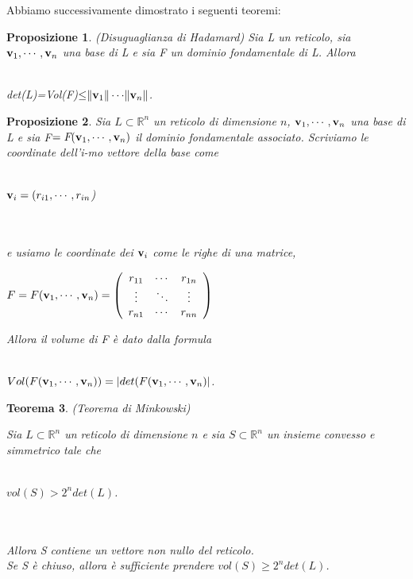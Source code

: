 \documentclass[a4paper,12pt]{report}
\theoremstyle{plain}
\newtheorem{thm}{Teorema}[section]
\newtheorem{prop}[thm]{Proposizione}
\theoremstyle{definition}
\theoremstyle{remark}
\begin{document}
Abbiamo successivamente dimostrato i seguenti teoremi:





\begin{prop}{(Disuguaglianza di Hadamard)}
Sia L un reticolo, sia $\textbf v_1,\cdots,\textbf v_n$ una base di L e sia \textit{F} un dominio fondamentale di L. Allora \\ \\
\centerline{det(L)=Vol(\textit{F})$\le\rVert\textbf v_1\rVert\cdots\rVert\textbf v_n\rVert$.}
\end{prop}





\begin{prop}
Sia $L\subset\mathbb{R}^n$ un reticolo di dimensione $n$, $\textbf v_1,\cdots,\textbf v_n$ una base di L e sia \textit{F}$=\textit{F}(\textbf v_1,\cdots,\textbf v_n)$ il dominio fondamentale associato. Scriviamo le coordinate dell'i-mo vettore della base come \\ \\ \centerline{$\textbf v_i=(r_{i1},\cdots,r_{in}$)} \\ \\ e usiamo le coordinate dei $\textbf v_i$ come le righe di una matrice,
\\ 


\centerline{ $ F=F(\textbf v_1,\cdots,\textbf v_n)=\left(
\begin{array} {ccc} 
r_{11} &\cdots & r_{1n}\\ 
\vdots & \ddots & \vdots\\
r_{n1} & \cdots & r_{nn}
 \end{array}\right)
$}
Allora il volume di F \` e dato dalla formula \\ \\ \centerline{$Vol(F(\textbf v_1,\cdots,\textbf v_n))=\left |det (F(\textbf v_1,\cdots,\textbf v_n) \right |$.}


\end{prop}




\begin{thm}{(Teorema di Minkowski)}

Sia $L\subset\mathbb{R}^n$ un reticolo di dimensione $n$ e sia $S\subset\mathbb{R}^n$ un insieme convesso e simmetrico tale che
\\ \\ \centerline{$vol(S)>2^n det(L)$.}\\ \\
Allora S contiene un vettore non nullo del reticolo.\\ Se S \` e chiuso, allora \` e sufficiente prendere $vol(S)\ge 2^n det(L)$.


\end{thm}
\end{document}
